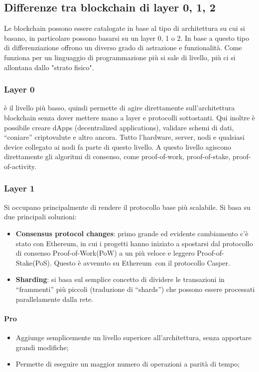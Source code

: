 \subsection{Differenze tra blockchain di layer 0, 1, 2}
Le blockchain possono essere catalogate in base al tipo di architettura su cui si basano, in particolare possono basarsi su un layer 0, 1 o 2.
In base a questo tipo di differenziazione offrono un diverso grado di astrazione e funzionalità. Come funziona per un linguaggio di programmazione
più si sale di livello, più ci si allontana dallo "strato fisico".

	\subsubsection{Layer 0}
    è il livello più basso, quindi permette di agire direttamente sull’architettura blockchain senza dover mettere mano a layer e protocolli sottostanti. 
    Qui inoltre è possibile creare dApps (decentralized applications), validare schemi di dati, “coniare” criptovalute e altro ancora.
    Tutto l’hardware, server, nodi e qualsiasi device collegato ai nodi fa parte di questo livello. 
    A questo livello agiscono direttamente gli algoritmi di consenso, come proof-of-work\glo, proof-of-stake\glo, proof-of-activity\glo.

    \subsubsection{Layer 1}
    Si occupano principalmente di rendere il protocollo base più scalabile. Si basa su due principali soluzioni:
    \begin{itemize}
        \item \textbf{Consensus protocol changes}: primo grande ed evidente cambiamento c’è stato con Ethereum\glo, in cui i progetti hanno iniziato a spostarsi 
        dal protocollo di consenso Proof-of-Work\glo (PoW) a un più veloce e leggero Proof-of-Stake\glo (PoS). Questo è avvenuto su Ethereum\glo\ con il protocollo Casper.
        \item \textbf{Sharding}: si basa sul semplice concetto di dividere le transazioni in “frammenti” più piccoli (traduzione di “shards”) che possono essere 
        processati parallelamente dalla rete.
    \end{itemize}
    \paragraph{Pro}
    \begin{itemize}
        \item Aggiunge semplicemente un livello superiore all’architettura, senza apportare grandi modifiche;
        \item Permette di eseguire un maggior numero di operazioni a parità di tempo;
    \end{itemize}
